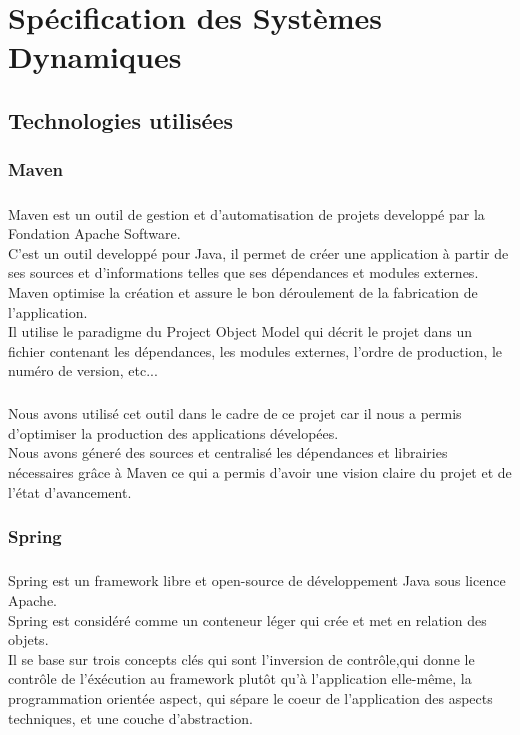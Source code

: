 \chapter{Spécification des Systèmes Dynamiques}
\section{Technologies utilisées}
\subsection{Maven}
\paragraph{} Maven est un outil de gestion et d'automatisation de projets developpé par la Fondation Apache Software.\\
C'est un outil developpé pour Java, il permet de créer une application à partir de ses sources et d'informations telles que ses dépendances et modules externes.\\
Maven optimise la création et assure le bon déroulement de la fabrication de l'application.\\
Il utilise le paradigme du Project Object Model qui décrit le projet dans un fichier contenant les dépendances, les modules externes, l'ordre de production, le numéro de version, etc...\\
\paragraph{}
Nous avons utilisé cet outil dans le cadre de ce projet car il nous a permis d'optimiser la production des applications dévelopées.\\
Nous avons géneré des sources et centralisé les dépendances et librairies nécessaires grâce à Maven ce qui a permis d'avoir une vision claire du projet et de l'état d'avancement.\\

\subsection{Spring}
\paragraph{} Spring est un framework libre et open-source de développement Java sous licence Apache.\\
Spring est considéré comme un conteneur léger qui crée et met en relation des objets.\\
Il se base sur trois concepts clés qui sont l'inversion de contrôle,qui donne le contrôle de l'éxécution au framework plutôt qu'à l'application elle-même, la programmation orientée aspect, qui sépare le coeur de l'application des aspects techniques, et une couche d'abstraction.\\ 
